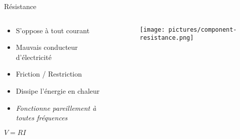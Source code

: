 \begin{frame}{Résistance}
    \begin{columns}
        \begin{column}{0.66\textwidth}
            \begin{itemize}
                \item S'oppose à tout courant
                \item Mauvais conducteur d'électricité
                \item Friction / Restriction
                \item Dissipe l'énergie en chaleur
                \item \textit{Fonctionne pareillement à toutes fréquences}
            \end{itemize}
            \par
            \begin{center}
                \Large{$V = RI$}
            \end{center}
        \end{column}
        \begin{column}{0.33\textwidth}
            \begin{figure}
                \centering
                \texttt{[image: pictures/component-resistance.png]}
            \end{figure}
        \end{column}
    \end{columns}
\end{frame}






